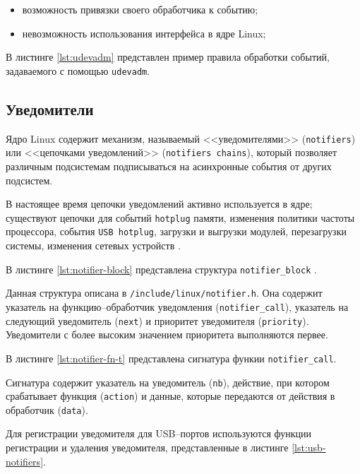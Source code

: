 \begin{itemize}
	\item возможность привязки своего обработчика к событию;
	\item невозможность использования интерфейса в ядре Linux;
\end{itemize}


В листинге \ref{lst:udevadm} представлен пример правила обработки событий, задаваемого с помощью \texttt{udevadm}.


\subsection{Уведомители}

Ядро Linux содержит механизм, называемый <<уведомителями>> (\texttt{notifiers}) или <<цепочками уведомлений>> (\texttt{notifiers chains}), который позволяет различным подсистемам подписываться на асинхронные события от других подсистем. 

В настоящее время цепочки уведомлений активно используется в ядре; существуют цепочки для событий \texttt{hotplug} памяти, изменения политики частоты процессора, события \texttt{USB hotplug}, загрузки и выгрузки модулей, перезагрузки системы, изменения сетевых устройств \cite{notifications}.

В листинге \ref{lst:notifier-block} представлена структура \texttt{notifier\_block} \cite{notifierblock}.


Данная структура описана в \texttt{/include/linux/notifier.h}. Она содержит указатель на функцию--обработчик уведомления (\texttt{notifier\_call}), указатель на следующий уведомитель (\texttt{next}) и приоритет уведомителя (\texttt{priority}). Уведомители с более высоким значением приоритета выполняются первее.

В листинге \ref{lst:notifier-fn-t} представлена сигнатура функии \texttt{notifier\_call}.


Сигнатура содержит указатель на уведомитель (\texttt{nb}), действие, при котором срабатывает функция (\texttt{action}) и данные, которые передаются от действия в обработчик (\texttt{data}).

Для регистрации уведомителя для USB--портов используются функции регистрации и удаления уведомителя, представленные в листинге \ref{lst:usb-notifiers}.

